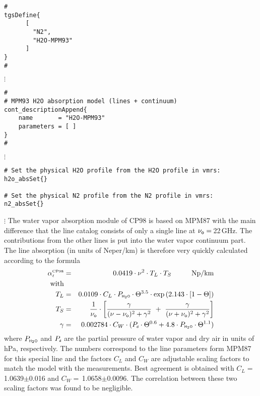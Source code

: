 
\begin{verbatim}
#
tgsDefine{
      [ 
        "N2",
        "H2O-MPM93"
      ] 
}
#
\end{verbatim}
$\vdots$
\begin{verbatim}
#
# MPM93 H2O absorption model (lines + continuum)
cont_descriptionAppend{
    name       = "H2O-MPM93"
    parameters = [ ]
}
#
\end{verbatim}
$\vdots$
\begin{verbatim}
# Set the physical H2O profile from the H2O profile in vmrs:
h2o_absSet{}

# Set the physical N2 profile from the N2 profile in vmrs:
n2_absSet{}
\end{verbatim}
$\vdots$
%
%
%
% 
\label{leveld:cp98}
%
\label{levele:cp98_line}
The water vapor absorption module of CP98 \cite{cruzpol:98} is based on 
MPM87 with the main difference that the line catalog consists of only a 
single line at $\nu_{\sf o}=$\,22\,GHz. 
The contributions from the other lines is put into the water vapor 
continuum part. The line absorption (in units of Neper/km) is therefore 
very quickly calculated according to the formula
\begin{eqnarray}
  \label{eq:cp98:lineabs}
  \alphacpl &=& 0.0419 \cdot \nu^2 \cdot T_L \cdot T_S\hspace*{10mm}\mbox{Np/km}\\
  \mbox{with} & & \nonumber\\
  T_L       &=& 0.0109 \cdot C_L \cdot \phzo \cdot \Theta^{3.5} 
                \cdot \exp{(2.143\cdot[1-\Theta])}\nonumber\\
  T_S       &=& \frac{1}{\nu_{\sf o}} \cdot 
                \left[\frac{\gamma}{(\nu-\nu_{\sf o})^2+\gamma^2}~+~
                \frac{\gamma}{(\nu+\nu_{\sf o})^2+\gamma^2}\right]\nonumber\\
  \gamma    &=& 0.002784 \cdot C_W \cdot (\pda \cdot \Theta^{0.6}+ 
                4.8 \cdot \phzo \cdot \Theta^{1.1}) \nonumber\\
\end{eqnarray}
where $P_{\mbox{\tiny \sf H}_{2}\mbox{\tiny \sf O}}$ and $P_{\mbox{\tiny \sf d}}$ are the partial pressure of water vapor and dry
air in units of hPa, respectively. The numbers correspond to the line
parameters form MPM87 for this special line and the factors  $C_L$ and $C_W$
are adjustable scaling factors to match the model with the
measurements. Best agreement is obtained with 
$C_L=$\,1.0639$\pm$0.016 and $C_W=$\,1.0658$\pm$0.0096. The
correlation between these two scaling factors was found to be
negligible.

